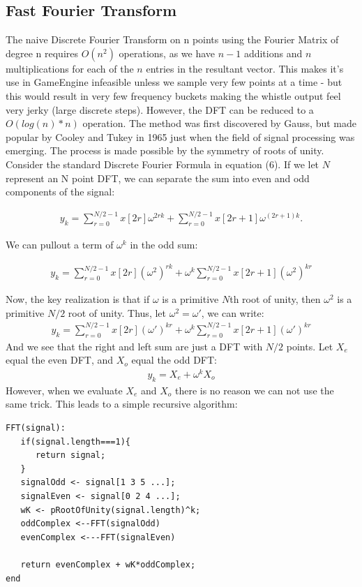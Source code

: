 \documentclass[DIV=calc, paper=a4, fontsize=11pt, twocolumn]{scrartcl}   %
\begin{document}
\subsection{Fast Fourier Transform}

The naive Discrete Fourier Transform on n points using the Fourier Matrix of degree n requires $O(n^2)$ operations, as we have $n-1$ additions and $n$ multiplications for each of the $n$ entries in the resultant vector. This makes it's use in GameEngine infeasible unless we sample very few points at a time - but this would result in very few frequency buckets making the whistle output feel very jerky (large discrete steps). However, the DFT can be reduced to a $O(log(n)*n)$ operation. The method was first discovered by Gauss, but made popular by Cooley and Tukey in 1965 just when the field of signal processing was emerging. The process is made possible by the symmetry of roots of unity. Consider the standard Discrete Fourier Formula in equation (6). If we let $N$ represent an N point DFT, we can separate the sum into even and odd components of the signal:

\begin{align}
y_k = \sum_{r=0}^{N/2-1}x[2r]\omega^{2rk} + \sum_{r=0}^{N/2-1}x[2r+1]\omega^{(2r+1)k}  .
\end{align}

We can pullout a term of $\omega^k$ in the odd sum:

\begin{align}
y_k = \sum_{r=0}^{N/2-1}x[2r](\omega^{2})^{rk} + \omega^k \sum_{r=0}^{N/2-1}x[2r+1](\omega^{2})^{kr}
\end{align}

Now, the key realization is that if $\omega$ is a primitive $N$th root of unity, then $\omega^2$ is a primitive $N/2$ root of unity. Thus, let $\omega^2 = \omega'$, we can write:
\begin{align}
y_k = \sum_{r=0}^{N/2-1}x[2r](\omega')^{kr} + \omega^k \sum_{r=0}^{N/2-1}x[2r+1](\omega')^{kr}
\end{align}
And we see that the right and left sum are just a DFT with $N/2$ points. Let $X_e$ equal the even DFT, and $X_o$ equal the odd DFT:
\begin{align}
y_k = X_e + \omega^k X_o
\end{align}
However, when we evaluate $X_e$ and $X_o$ there is no reason we can not use the same trick. This leads to a simple recursive algorithm:

\begin{lstlisting}
FFT(signal):
   if(signal.length===1){
      return signal;
   }
   signalOdd <- signal[1 3 5 ...];
   signalEven <- signal[0 2 4 ...];
   wK <- pRootOfUnity(signal.length)^k;
   oddComplex <--FFT(signalOdd)
   evenComplex <---FFT(signalEven)

   return evenComplex + wK*oddComplex;
end
\end{lstlisting}
\end{document}
